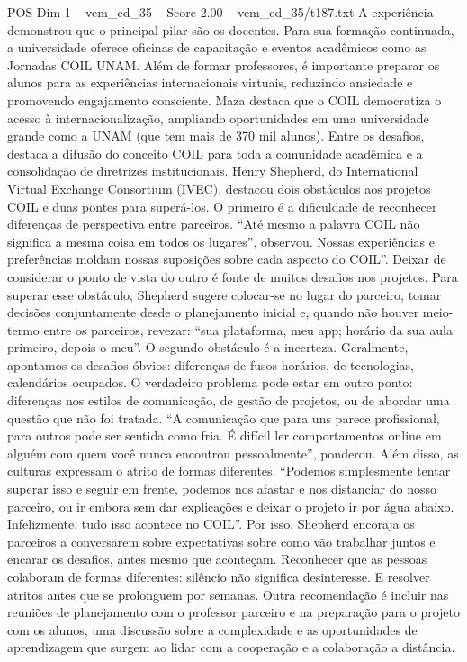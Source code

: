 \begin{textsample}{POS Dim 1 – vem\_ed\_35 – Score 2.00 – vem\_ed\_35/t187.txt}
A experiência demonstrou que o principal pilar são os docentes.
Para sua formação continuada, a universidade oferece oficinas de capacitação e eventos acadêmicos como as Jornadas COIL UNAM.
Além de formar professores, é importante preparar os alunos para as experiências internacionais virtuais, reduzindo ansiedade e promovendo engajamento consciente.
Maza destaca que o COIL democratiza o acesso à internacionalização, ampliando oportunidades em uma universidade grande como a UNAM (que tem mais de 370 mil alunos).
Entre os desafios, destaca a difusão do conceito COIL para toda a comunidade acadêmica e a consolidação de diretrizes institucionais.
Henry Shepherd, do International Virtual Exchange Consortium (IVEC), destacou dois obstáculos aos projetos COIL e duas pontes para superá-los.
O primeiro é a dificuldade de reconhecer diferenças de perspectiva entre parceiros. “Até mesmo a palavra COIL não significa a mesma coisa em todos os lugares”, observou.
Nossas experiências e preferências moldam nossas suposições sobre cada aspecto do COIL”.
Deixar de considerar o ponto de vista do outro é fonte de muitos desafios nos projetos.
Para superar esse obstáculo, Shepherd sugere colocar-se no lugar do parceiro, tomar decisões conjuntamente desde o planejamento inicial e, quando não houver meio-termo entre os parceiros, revezar: “sua plataforma, meu app; horário da sua aula primeiro, depois o meu”.
O segundo obstáculo é a incerteza.
Geralmente, apontamos os desafios óbvios: diferenças de fusos horários, de tecnologias, calendários ocupados.
O verdadeiro problema pode estar em outro ponto: diferenças nos estilos de comunicação, de gestão de projetos, ou de abordar uma questão que não foi tratada. “A comunicação que para uns parece profissional, para outros pode ser sentida como fria.
É difícil ler comportamentos online em alguém com quem você nunca encontrou pessoalmente”, ponderou.
Além disso, as culturas expressam o atrito de formas diferentes. “Podemos simplesmente tentar superar isso e seguir em frente, podemos nos afastar e nos distanciar do nosso parceiro, ou ir embora sem dar explicações e deixar o projeto ir por água abaixo.
Infelizmente, tudo isso acontece no COIL”.
Por isso, Shepherd encoraja os parceiros a conversarem sobre expectativas sobre como vão trabalhar juntos e encarar os desafios, antes mesmo que aconteçam.
Reconhecer que as pessoas colaboram de formas diferentes: silêncio não significa desinteresse.
E resolver atritos antes que se prolonguem por semanas.
Outra recomendação é incluir nas reuniões de planejamento com o professor parceiro e na preparação para o projeto com os alunos, uma discussão sobre a complexidade e as oportunidades de aprendizagem que surgem ao lidar com a cooperação e a colaboração a distância.

\end{textsample}

